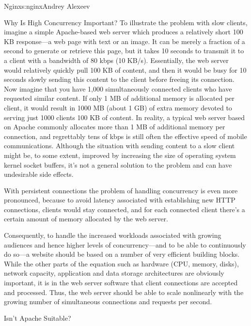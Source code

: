 \begin{aosachapter}{Nginx}{s:nginx}{Andrey Alexeev}
\begin{aosasect1}{Why Is High Concurrency Important?}
To illustrate the problem with slow clients, imagine a simple
Apache-based web server which produces a relatively short 100 KB
response---a web page with text or an image. It can be merely a
fraction of a second to generate or retrieve this page, but it takes
10 seconds to transmit it to a client with a bandwidth of 80 kbps (10
KB/s). Essentially, the web server would relatively quickly pull 100
KB of content, and then it would be busy for 10 seconds slowly sending
this content to the client before freeing its connection. Now imagine
that you have 1,000 simultaneously connected clients who have
requested similar content. If only 1 MB of additional memory is
allocated per client, it would result in 1000 MB (about 1 GB) of
extra memory devoted to serving just 1000 clients 100 KB of
content. In reality, a typical web server based on Apache commonly
allocates more than 1 MB of additional memory per connection, and
regrettably tens of kbps is still often the effective speed of mobile
communications. Although the situation with sending content to a slow
client might be, to some extent, improved by increasing the size of
operating system kernel socket buffers, it's not a general solution to
the problem and can have undesirable side effects.

With persistent connections the problem of handling concurrency is
even more pronounced, because to avoid latency associated with
establishing new HTTP connections, clients would stay connected, and
for each connected client there's a certain amount of memory allocated
by the web server.

Consequently, to handle the increased workloads associated with
growing audiences and hence higher levels of concurrency---and to be
able to continuously do so---a website should be based on a number of
very efficient building blocks. While the other parts of the equation
such as hardware (CPU, memory, disks), network capacity, application
and data storage architectures are obviously important, it is in the
web server software that client connections are accepted and
processed. Thus, the web server should be able to scale nonlinearly
with the growing number of simultaneous connections and requests per
second.

\begin{aosasect2}{Isn't Apache Suitable?}


\end{aosasect2}
\end{aosasect1}
\end{aosachapter}

